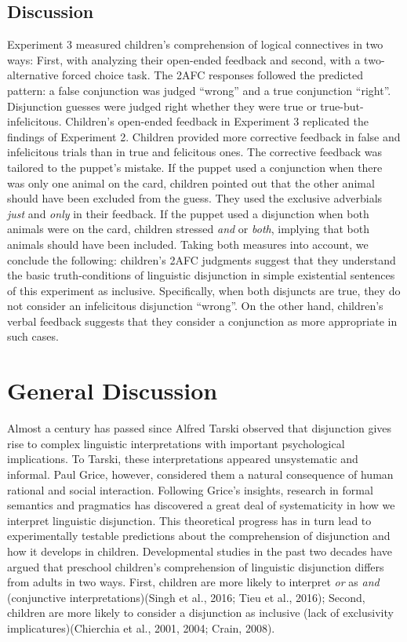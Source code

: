 \documentclass[,man,floatsintext]{apa6}
\begin{document}
\hypertarget{discussion-2}{%
\subsection{Discussion}\label{discussion-2}}

Experiment 3 measured children's comprehension of logical connectives in two ways: First, with analyzing their open-ended feedback and second, with a two-alternative forced choice task. The 2AFC responses followed the predicted pattern: a false conjunction was judged \enquote{wrong} and a true conjunction \enquote{right}. Disjunction guesses were judged right whether they were true or true-but-infelicitous. Children's open-ended feedback in Experiment 3 replicated the findings of Experiment 2. Children provided more corrective feedback in false and infelicitous trials than in true and felicitous ones. The corrective feedback was tailored to the puppet's mistake. If the puppet used a conjunction when there was only one animal on the card, children pointed out that the other animal should have been excluded from the guess. They used the exclusive adverbials \emph{just} and \emph{only} in their feedback. If the puppet used a disjunction when both animals were on the card, children stressed \emph{and} or \emph{both}, implying that both animals should have been included. Taking both measures into account, we conclude the following: children's 2AFC judgments suggest that they understand the basic truth-conditions of linguistic disjunction in simple existential sentences of this experiment as inclusive. Specifically, when both disjuncts are true, they do not consider an infelicitous disjunction \enquote{wrong}. On the other hand, children's verbal feedback suggests that they consider a conjunction as more appropriate in such cases.

\hypertarget{general-discussion}{%
\section{General Discussion}\label{general-discussion}}

Almost a century has passed since Alfred Tarski observed that disjunction gives rise to complex linguistic interpretations with important psychological implications. To Tarski, these interpretations appeared unsystematic and informal. Paul Grice, however, considered them a natural consequence of human rational and social interaction. Following Grice's insights, research in formal semantics and pragmatics has discovered a great deal of systematicity in how we interpret linguistic disjunction. This theoretical progress has in turn lead to experimentally testable predictions about the comprehension of disjunction and how it develops in children. Developmental studies in the past two decades have argued that preschool children's comprehension of linguistic disjunction differs from adults in two ways. First, children are more likely to interpret \emph{or} as \emph{and} (conjunctive interpretations)(Singh et al., 2016; Tieu et al., 2016); Second, children are more likely to consider a disjunction as inclusive (lack of exclusivity implicatures)(Chierchia et al., 2001, 2004; Crain, 2008).
\end{document}
